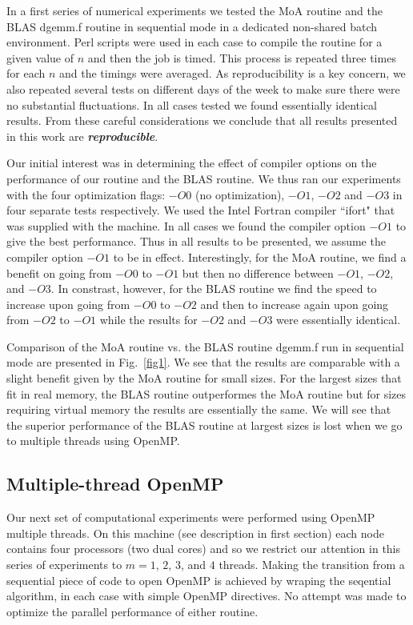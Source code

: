 \documentclass[aps,prl,twocolumn,groupedaddress,floatfix]{revtex4}
\begin{document}
In a first series of numerical experiments we tested the MoA routine and 
the BLAS dgemm.f routine in sequential mode in a dedicated non-shared 
batch environment.  Perl scripts were used in each case to compile the
routine for a given value of $n$ and then the job is timed.  This process
is repeated three times for each $n$ and the timings were averaged.  As 
reproducibility is a key concern, we also repeated several tests on 
different days of the week to make sure there were no substantial 
fluctuations.  In all cases
tested we found essentially identical results.  From these careful 
considerations we conclude that all results presented in this work are
{\bf \em reproducible}.

Our initial interest was in determining the effect of
compiler options on the performance of our routine and the BLAS routine.  We 
thus ran our experiments with the four optimization flags: 
$-O0$ (no optimization), $-O1$, $-O2$ and $-O3$ in four separate tests 
respectively.  We used the Intel Fortran compiler ``ifort" that was supplied
with the machine.  In all cases we found the compiler option $-O1$ to give 
the best performance.  Thus in all results to be presented, we assume the
compiler option $-O1$ to be in effect.  Interestingly, for the MoA routine,
we find a benefit on going from $-O0$ to $-O1$ but then no difference between
$-O1$, $-O2$, and $-O3$. In constrast, however, for the BLAS routine we find
the speed to increase upon going from $-O0$ to $-O2$ and then to increase
again upon going from $-O2$ to $-O1$ while the results for $-O2$ and 
$-O3$ were essentially identical.

Comparison of the MoA routine vs. the BLAS routine dgemm.f run in sequential
mode are presented in Fig.~\ref{fig1}.  We see that the results are 
comparable with a slight benefit given by the MoA routine for small sizes.
For the largest sizes that fit in real memory, the BLAS routine outperformes
the MoA routine but for sizes requiring virtual memory the results are
essentially the same.  We will see that the superior performance of the 
BLAS routine at largest sizes is lost when we go to multiple threads 
using OpenMP.

\subsection{Multiple-thread OpenMP}

Our next set of computational experiments were performed using OpenMP
multiple threads.  On this machine (see description in first section)
each node contains four processors (two dual cores) and so we 
restrict our attention in 
this series of experiments to $m = 1$, $2$, $3$, and $4$ threads.  Making
the transition from a sequential piece of code to open OpenMP is achieved
by wraping the seqential algorithm, in each case with simple OpenMP directives.
No attempt was made to optimize the parallel performance of either routine.
\end{document}
